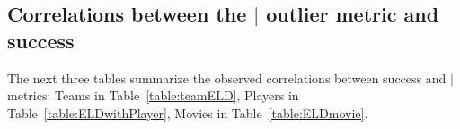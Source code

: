 	
	
	\subsection{Correlations between the $\mid$ outlier metric and success}
	
	The next three tables summarize the observed correlations between success and $\mid$ metrics: Teams in Table~\ref{table:teamELD}, Players in Table~\ref{table:ELDwithPlayer},  Movies in Table~\ref{table:ELDmovie}.

		
		
